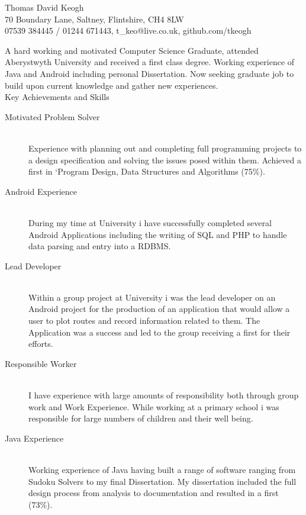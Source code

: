 \documentclass[10pt,a4paper]{article}
\begin{document}
\begin{center}
\huge
Thomas David Keogh\\
\normalsize
70 Boundary Lane, Saltney, Flintshire, CH4 8LW\\
07539 384445 / 01244 671443, t\_keo@live.co.uk, github.com/tkeogh

\end{center}



\noindent
A hard working and motivated Computer Science Graduate, attended Aberystwyth University and received a first class degree. Working experience of Java and Android including personal Dissertation. Now seeking graduate job to build upon current knowledge and gather new experiences.\\

\Large
\noindent
Key Achievements and Skills\\
\normalsize
\begin{description}
  \item[Motivated Problem Solver] \hfill \\ Experience with planning out and completing full programming projects to a design specification and solving the issues posed within them. Achieved a first in ‘Program Design, Data Structures and Algorithms (75\%).
  \item[Android Experience]\hfill \\ During my time at University i have successfully completed several Android Applications including the writing of SQL and PHP to handle data parsing and entry into a RDBMS.
  \item[Lead Developer]\hfill \\ Within a group project at University  i was the lead developer on an Android project for the production of an application that would allow a user to plot routes and record information related to them. The Application was a success and led to the group receiving a first for their efforts. 
   \item[Responsible Worker ]\hfill \\ I have experience with large amounts of responsibility both through group work and Work Experience. While working at a primary school i was responsible for large numbers of children and their well being. 
    \item[Java Experience]\hfill \\ Working experience of Java having built a range of software ranging from Sudoku Solvers to my final Dissertation. My dissertation included the full design process from analysis to documentation and resulted in  a first (73\%).\\
\end{description}
\end{document}
